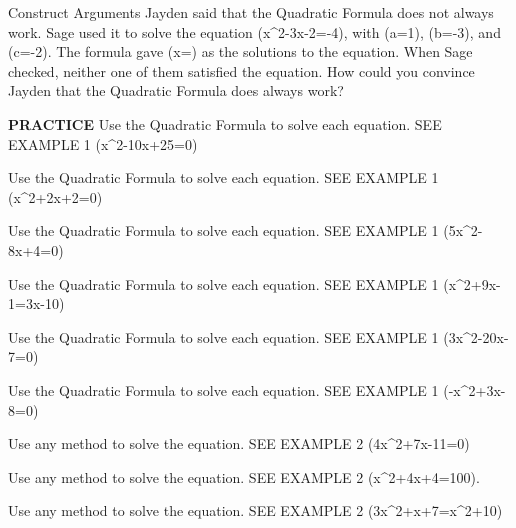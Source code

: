 \documentclass{article}
\newenvironment{practice}[2]{}{}        %
\newcommand{\answer}[1]{}               %
\begin{document}
\begin{practice}{15}{2}
Construct Arguments Jayden said that the Quadratic Formula does not always work. Sage used it to solve the equation (x^2-3x-2=-4), with (a=1), (b=-3), and (c=-2). The formula gave (x=) as the solutions to the equation. When Sage checked, neither one of them satisfied the equation. How could you convince Jayden that the Quadratic Formula does always work?
\answer{Remind Sage to set the equation equal to 0 before identifying a, b, and c. Setting the equation equal to 0 shows that (c=2), not -2. When using the correct values for a, b, and c, the solutions will check.}
\end{practice}
\begin{practice}{16}{1}
\textbf{PRACTICE} Use the Quadratic Formula to solve each equation. SEE EXAMPLE 1
(x^2-10x+25=0)
\answer{(x=5)}
\end{practice}
\begin{practice}{17}{1}
Use the Quadratic Formula to solve each equation. SEE EXAMPLE 1
(x^2+2x+2=0)
\answer{(x=-1\pm i)}
\end{practice}
\begin{practice}{18}{1}
Use the Quadratic Formula to solve each equation. SEE EXAMPLE 1
(5x^2-8x+4=0)
\answer{(x=\frac{4}{5}\pm\frac{2}{5}i)}
\end{practice}
\begin{practice}{19}{1}
Use the Quadratic Formula to solve each equation. SEE EXAMPLE 1
(x^2+9x-1=3x-10)
\answer{(x=-3)}
\end{practice}
\begin{practice}{20}{1}
Use the Quadratic Formula to solve each equation. SEE EXAMPLE 1
(3x^2-20x-7=0)
\answer{(x=7) or (x=-\frac{1}{3})}
\end{practice}
\begin{practice}{21}{1}
Use the Quadratic Formula to solve each equation. SEE EXAMPLE 1
(-x^2+3x-8=0)
\answer{(x=\frac{3}{2}\pm\frac{\sqrt{23}}{2}i)}
\end{practice}
\begin{practice}{22}{1}
Use any method to solve the equation. SEE EXAMPLE 2
(4x^2+7x-11=0)
\answer{(x=1) or (x=-\frac{11}{4})}
\end{practice}
\begin{practice}{23}{1}
Use any method to solve the equation. SEE EXAMPLE 2
(x^2+4x+4=100).
\answer{(x=8) or (x=-12)}
\end{practice}
\begin{practice}{24}{1}
Use any method to solve the equation. SEE EXAMPLE 2
(3x^2+x+7=x^2+10)
\answer{(x=1) or (x=-\frac{3}{2})}
\end{practice}
\end{document}
